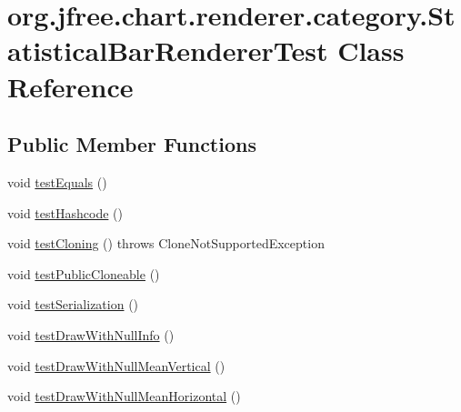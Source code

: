 \hypertarget{classorg_1_1jfree_1_1chart_1_1renderer_1_1category_1_1_statistical_bar_renderer_test}{}\section{org.\+jfree.\+chart.\+renderer.\+category.\+Statistical\+Bar\+Renderer\+Test Class Reference}
\label{classorg_1_1jfree_1_1chart_1_1renderer_1_1category_1_1_statistical_bar_renderer_test}
\subsection*{Public Member Functions}
\begin{DoxyCompactItemize}
\item 
void \mbox{\hyperlink{classorg_1_1jfree_1_1chart_1_1renderer_1_1category_1_1_statistical_bar_renderer_test_a1b5a7e609fde4183a3d9eb9e356042ef}{test\+Equals}} ()
\item 
void \mbox{\hyperlink{classorg_1_1jfree_1_1chart_1_1renderer_1_1category_1_1_statistical_bar_renderer_test_ad99825ae39c530b30073412a91ddc2ab}{test\+Hashcode}} ()
\item 
void \mbox{\hyperlink{classorg_1_1jfree_1_1chart_1_1renderer_1_1category_1_1_statistical_bar_renderer_test_abb8b6a706b133c2bee540b1900d5dd85}{test\+Cloning}} ()  throws Clone\+Not\+Supported\+Exception 
\item 
void \mbox{\hyperlink{classorg_1_1jfree_1_1chart_1_1renderer_1_1category_1_1_statistical_bar_renderer_test_aa25476595a71144ad7cafc4b03542846}{test\+Public\+Cloneable}} ()
\item 
void \mbox{\hyperlink{classorg_1_1jfree_1_1chart_1_1renderer_1_1category_1_1_statistical_bar_renderer_test_adf1693923c89fd159e8a92057e6417f8}{test\+Serialization}} ()
\item 
void \mbox{\hyperlink{classorg_1_1jfree_1_1chart_1_1renderer_1_1category_1_1_statistical_bar_renderer_test_a24d52d0cc232821bdf8a07c25d12da15}{test\+Draw\+With\+Null\+Info}} ()
\item 
void \mbox{\hyperlink{classorg_1_1jfree_1_1chart_1_1renderer_1_1category_1_1_statistical_bar_renderer_test_a468c680b219fc4518751bd8dbaa7ace0}{test\+Draw\+With\+Null\+Mean\+Vertical}} ()
\item 
void \mbox{\hyperlink{classorg_1_1jfree_1_1chart_1_1renderer_1_1category_1_1_statistical_bar_renderer_test_a93348cbc8ab18b143981789e84f70d57}{test\+Draw\+With\+Null\+Mean\+Horizontal}} ()

\end{DoxyCompactItemize}
